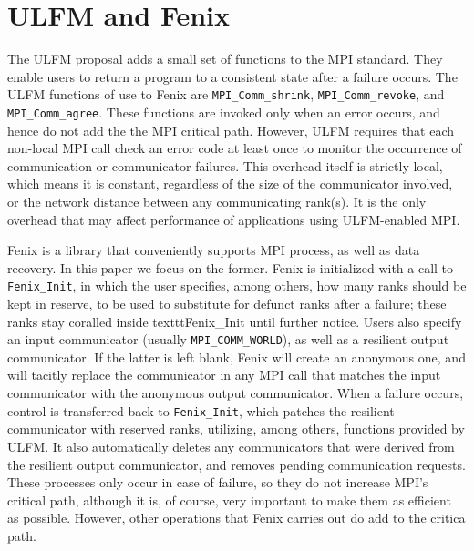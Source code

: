 \section{ULFM and Fenix}\label{sec:implem}
The ULFM proposal adds a small set of functions to the MPI standard.
They enable users to return a program to a consistent state after a failure occurs.
The ULFM functions of use to Fenix are \texttt{MPI\_Comm\_shrink},
\texttt{MPI\_Comm\_revoke}, and \texttt{MPI\_Comm\_agree}.
These functions are invoked only when an error occurs, and hence do
not add the the MPI critical path.
However, ULFM requires that each non-local MPI call check an error code at least once to
monitor the occurrence of communication or communicator failures.
This overhead itself is strictly local, which means it is constant, regardless of the
size of the communicator involved, or the network distance between any communicating rank(s).
It is the only overhead that may affect performance of applications using
ULFM-enabled MPI.

Fenix is a library \cite{fenixspec} that conveniently supports MPI process,
as well as data recovery. In this paper we focus on the former.
Fenix is initialized with a call to \texttt{Fenix\_Init}, in which the user specifies,
among others, how many ranks should be kept in reserve, to be used to substitute for
defunct ranks after a failure; these ranks stay coralled inside texttt{Fenix\_Init}
until further notice.
Users also specify an input communicator (usually \texttt{MPI\_COMM\_WORLD}), as well
as a resilient output communicator.
If the latter is left blank, Fenix will create an anonymous one, and will tacitly
replace the communicator in any MPI call that matches the input communicator with
the anonymous output communicator.
When a failure occurs, control is transferred back to \texttt{Fenix\_Init}, which patches
the resilient communicator with reserved ranks, utilizing, among others, functions
provided by ULFM.
It also automatically deletes any communicators that were derived from the resilient output
communicator, and removes pending communication requests.
These processes only occur in case of failure, so they do not increase MPI's critical
path, although it is, of course, very important to make them as efficient as possible.
However, other operations that Fenix carries out do add to the critica path.

